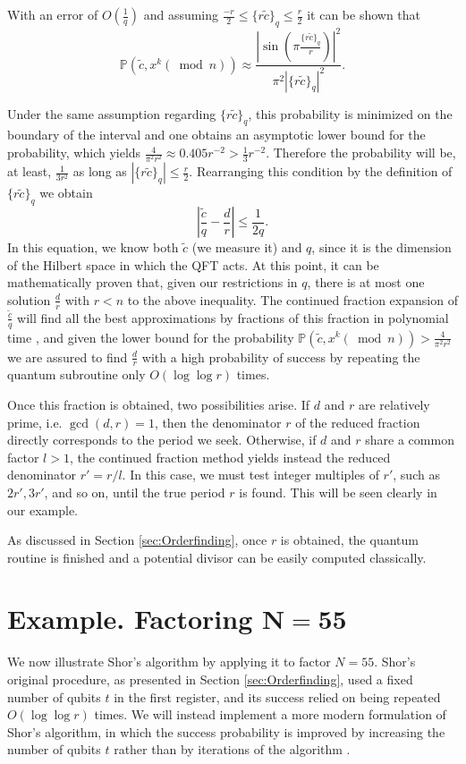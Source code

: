 \documentclass[aps,prl,twocolumn,superscriptaddress,groupedaddress]{revtex4}  %
\begin{document}
With an error of $O(\frac{1}{q})$ and assuming $\frac{-r}{2}\le \{r\tilde{c}\}_q\le \frac{r}{2}$ it can be shown that \[\mathbb{P}(\tilde{c},x^k(\bmod{n}))\approx\frac{\left|\sin\left(\pi \frac{\{r\tilde{c}\}_q}{r}\right) \right|^2}{\pi^2 \left|\{r\tilde{c}\}_q\right|^2}.\]


Under the same assumption regarding $\{r\tilde{c}\}_q$, this probability is minimized on the boundary of the interval and one obtains an asymptotic lower bound for the probability, which yields $\frac{4}{\pi^2 r^2}\approx0.405 r^{-2}>\frac{1}{3}r^{-2}$. Therefore the probability will be, at least, $\frac{1}{3r^2}$ as long as $\left|\{r\tilde{c}\}_q\right|\le \frac{r}{2}$. Rearranging this condition by the definition of $\{r\tilde{c}\}_q$ we obtain 
\[\left|\frac{\tilde{c}}{q}-\frac{d}{r}\right|\le\frac{1}{2q}.\]
In this equation, we know both $\tilde{c}$ (we measure it) and $q$, since it is the dimension of the Hilbert space in which the QFT acts. At this point, it can be mathematically proven that, given our restrictions in $q$, there is at most one solution $\frac{d}{r}$ with $r<n$ to the above inequality. The continued fraction expansion of $\frac{\tilde{c}}{q}$ will find all the best approximations by fractions of this fraction in polynomial time \cite{hardy2008introduction}, and given the lower bound for the probability $ \mathbb{P}(\tilde{c},x^k(\bmod{n}))>\frac{4}{\pi^2r^2}$ we are assured to find $\frac{d}{r}$ with a high probability of success by repeating the quantum subroutine only $O(\log \log r)$ times. 

Once this fraction is obtained, two possibilities arise. If $d$ and $r$ are relatively prime, i.e. $\gcd(d, r) = 1$, then the denominator $r$ of the reduced fraction directly corresponds to the period we seek. Otherwise, if $d$ and $r$ share a common factor $l > 1$, the continued fraction method yields instead the reduced denominator $r' = r/l$. In this case, we must test integer multiples of $r'$, such as $2r', 3r'$, and so on, until the true period $r$ is found. This will be seen clearly in our example.

As discussed in Section \ref{sec:Orderfinding}, once $r$ is obtained, the quantum routine is finished and a potential divisor can be easily computed classically.

\section{Example. Factoring $\mathbf{N=55}$ \label{sec:Example}}
We now illustrate Shor's algorithm by applying it to factor $N=55$. Shor's original procedure, as presented in Section \ref{sec:Orderfinding}, used a fixed number of qubits $t$ in the first register, and its success relied on being repeated $O(\log \log r)$ times. We will instead implement a more modern formulation of Shor's algorithm, in which the success probability is improved by increasing the number of qubits $t$ rather than by iterations of the algorithm \cite{kitaev_quantum_1995, cleve_quantum_1997}.
\end{document}
